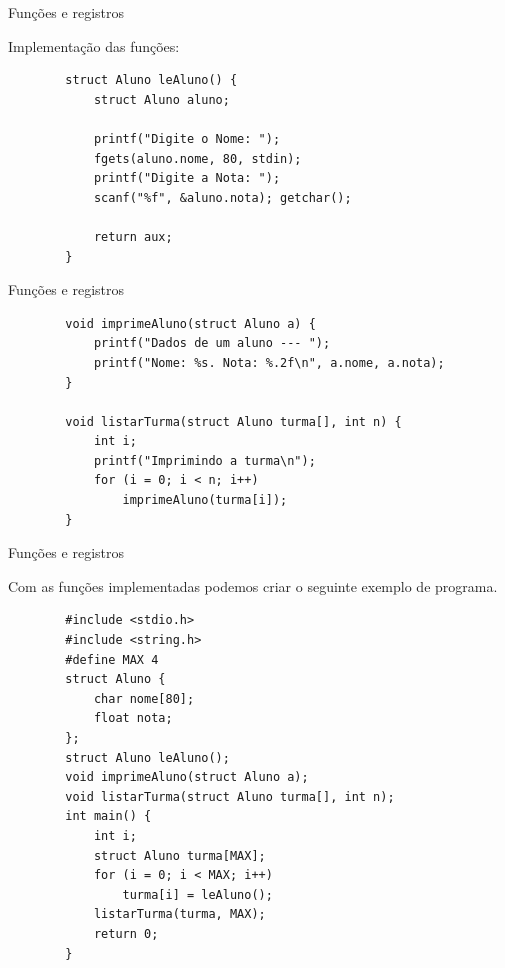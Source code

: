 \documentclass[handout]{beamer}
\begin{document}
\begin{frame}[fragile]{Funções e registros}

    Implementação das funções:

    \begin{verbatim}
        struct Aluno leAluno() {
            struct Aluno aluno;

            printf("Digite o Nome: ");
            fgets(aluno.nome, 80, stdin);
            printf("Digite a Nota: ");
            scanf("%f", &aluno.nota); getchar();

            return aux;
        }
    \end{verbatim}

\end{frame}

\begin{frame}[fragile]{Funções e registros}

    \begin{verbatim}
        void imprimeAluno(struct Aluno a) {
            printf("Dados de um aluno --- ");
            printf("Nome: %s. Nota: %.2f\n", a.nome, a.nota);
        }

        void listarTurma(struct Aluno turma[], int n) {
            int i;
            printf("Imprimindo a turma\n");
            for (i = 0; i < n; i++)
                imprimeAluno(turma[i]);
        }
    \end{verbatim}

\end{frame}

\begin{frame}[fragile]{Funções e registros}

    Com as funções implementadas podemos criar o seguinte exemplo
    de programa.
    \vspace{-1em}
    \begin{verbatim}
        #include <stdio.h>
        #include <string.h>
        #define MAX 4
        struct Aluno {
            char nome[80];
            float nota;
        };
        struct Aluno leAluno();
        void imprimeAluno(struct Aluno a);
        void listarTurma(struct Aluno turma[], int n);
        int main() {
            int i;
            struct Aluno turma[MAX];
            for (i = 0; i < MAX; i++)
                turma[i] = leAluno();
            listarTurma(turma, MAX);
            return 0;
        }
    \end{verbatim}

\end{frame}
\end{document}
